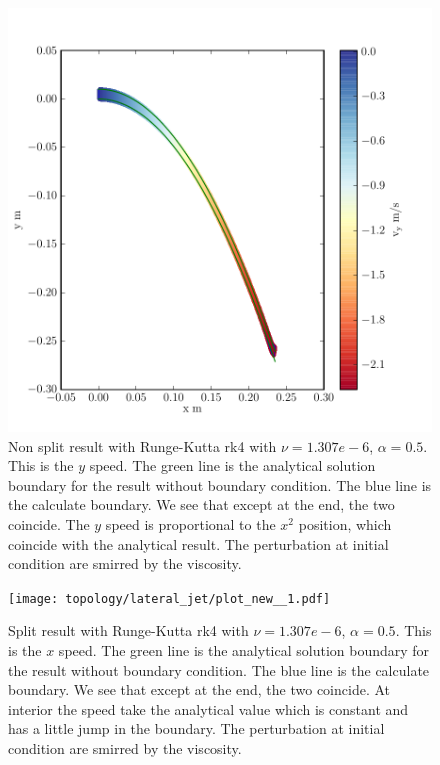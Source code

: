 \begin{figure}
	\includegraphics{topology/lateral_jet/plot_8__2_186.pdf}
	\caption{Non split result with Runge-Kutta rk4 with $\nu=1.307e-6$, $\alpha=0.5$.
	This is the $y$ speed.
	The green line is the analytical solution boundary for the result without boundary condition.
	The blue line is the calculate boundary.
	We see that except at the end, the two coincide.
	The $y$ speed is proportional to the $x^2$ position, which coincide with the analytical result.
	The perturbation at initial condition are smirred by the viscosity.}
	\label{topo:extrap:lateral:8_2}
\end{figure}

\begin{figure}
	\texttt{[image: topology/lateral\_jet/plot\_new\_\_1.pdf]}
		\caption{Split result with Runge-Kutta rk4 with $\nu=1.307e-6$, $\alpha=0.5$.
	This is the $x$ speed.
	The green line is the analytical solution boundary for the result without boundary condition.
	The blue line is the calculate boundary.
	We see that except at the end, the two coincide.
	At interior the speed take the analytical value which is constant and has a little jump in the boundary.
	The perturbation at initial condition are smirred by the viscosity.}
	\label{topo:extrap:lateral:9_1}
\end{figure}

